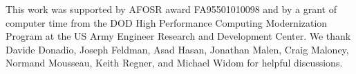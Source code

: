 \documentclass[aps,prb,onecolumn,preprint,superscriptaddress,footinbib,amsmath,amssymb,floatfix]{revtex4}
\begin{document}
\begin{acknowledgements}
This work was supported by AFOSR award FA95501010098 and by a grant 
of computer time from the DOD 
High Performance Computing Modernization Program at the US Army 
Engineer 
Research and Development Center. 
We thank Davide Donadio, Joseph Feldman, Asad Hasan, Jonathan Malen,  
Craig Maloney, Normand Mousseau, Keith Regner, and Michael Widom 
for helpful discussions.
\end{acknowledgements}



\end{document}
